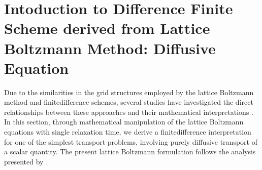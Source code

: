 \documentclass[letterpaper,10pt,english,openany,oneside]{jupyterBook}
\begin{document}
\chapter{Intoduction to Difference Finite Scheme derived from Lattice Boltzmann Method: Diffusive Equation}
\label{\detokenize{Refs/LBM-Study/FDM-Belloti/FDM-LBM-Diffusive:intoduction-to-difference-finite-scheme-derived-from-lattice-boltzmann-method-diffusive-equation}}\label{\detokenize{Refs/LBM-Study/FDM-Belloti/FDM-LBM-Diffusive::doc}}
\sphinxAtStartPar
Due to the similarities in the grid structures employed by the lattice Boltzmann method and finite\sphinxhyphen{}difference schemes, several studies have investigated the direct relationships between these approaches and their mathematical interpretations . In this section, through mathematical manipulation of the lattice Boltzmann equations with single relaxation time, we derive a finite\sphinxhyphen{}difference interpretation for one of the simplest transport problems, involving purely diffusive transport of a scalar quantity. The present lattice Boltzmann formulation follows the analysis presented by .
\end{document}
